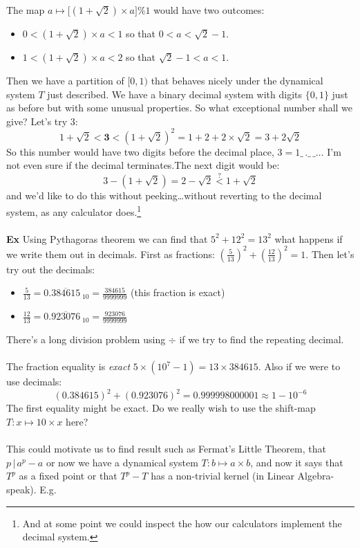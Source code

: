 \documentclass[12pt]{article}
\begin{document}
The map $a \mapsto \big[ (1 + \sqrt{2}) \times a \big] \% 1$ would have two outcomes:
\begin{itemize}
\item $0 < (1 + \sqrt{2}) \times a  < 1 $ so that $0 < a < \sqrt{2}-1$.
\item $1 < (1 + \sqrt{2}) \times a  < 2 $ so that $\sqrt{2}-1 < a < 1 $.
\end{itemize}
Then we have a partition of $[0,1)$ that behaves nicely under the dynamical system $T$ just described.  We have a binary decimal system with digits $\{ 0, 1\}$ just as before but with some unusual properties.  So what exceptional number shall we give?  Let's try $3$:
$$1  + \sqrt{2} < \mathbf{3} < (1 + \sqrt{2})^2 = 1 + 2 + 2 \times \sqrt{2} = 3 + 2 \sqrt{2} $$
So this number would have two digits before the decimal place, $3 = 1\_\,.\_\,\_\dots$
I'm not even sure if the decimal terminates.The next digit would be:
$$ 3 - (1 + \sqrt{2}) = 2 - \sqrt{2} \stackrel{?}{<} 1 + \sqrt{2} $$
and we'd like to do this without peeking\dots without reverting to the decimal system, as any calculator does.\footnote{And at some point we could inspect the how our calculators implement the decimal system.} \\ \\
\textbf{Ex}  Using Pythagoras theorem we can find that $5^2 + 12^2 = 13^2$ what happens if we write them out in decimals.  First as fractions: $(\frac{5}{13})^2 + (\frac{12}{13})^2 = 1$.  Then let's try out the decimals:
\begin{itemize}
\item $\frac{5}{13} = 0.\overline{384615}_{\;10} = \frac{384615}{9999999} $ (this fraction is exact)
\item $\frac{12}{13} = 0.\overline{923076}_{\;10} = \frac{923076}{9999999}$
\end{itemize}
There's a long division problem using $\div$ if we try to find the repeating decimal.  \\ \\
The fraction equality is \textit{exact} $5 \times (10^7 - 1) = 13 \times 384615$.  Also if we were to use decimals:
$$ (0.384615)^2 + (0.923076)^2 =  0.999998000001 \approx 1 - 10^{-6} $$
The first equality might be exact.  Do we really wish to use the shift-map $T:x \mapsto 10\times x$ here? \\ \\
This could motivate us to find result such as Fermat's Little Theorem, that $p \,\big|\, a^p - a $ or now we have a dynamical system $T: b \mapsto a \times b $, and now it says that $T^p$ as a fixed point or that $T^p - T$ has a non-trivial kernel (in Linear Algebra-speak). E.g. 
\end{document}

